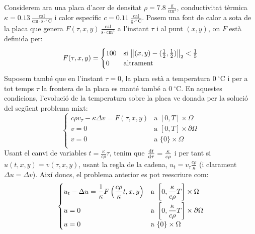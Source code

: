 \documentclass[10pt,a4paper]{article}
\theoremstyle{definition}
\theoremstyle{remark}
\begin{document}
Considerem ara una placa d'acer de densitat $\rho= 7.8\ \frac{\mathrm{g}}{\mathrm{cm}^3}$, conductivitat tèrmica $\kappa = 0.13\ \frac{\mathrm{cal}}{\mathrm{cm}\cdot\mathrm{s}\cdot^\circ\mathrm{C}}$ i calor específic $c=0.11\ \frac{\mathrm{cal}}{\mathrm{g}\cdot^\circ\mathrm{C}}$. Posem una font de calor a sota de la placa que genera $F(\tau, x,y) \ \frac{\mathrm{cal}}{\mathrm{s}\cdot\mathrm{cm}^3}$ a l'instant $\tau$ i al punt $(x,y)$, on $F$ està definida per:
$$
  F(\tau, x,y) = \begin{cases}
    100 & \text{si } \norm{(x,y)-(\frac{1}{2},\frac{1}{2})}_2 <\frac{1}{5} \\
    0   & \text{altrament}
  \end{cases}
$$
Suposem també que en l'instant $\tau=0$, la placa està a temperatura $0\ ^\circ\mathrm{C}$ i per a tot temps $\tau$ la frontera de la placa es manté també a $0\ ^\circ\mathrm{C}$. En aquestes condicions, l'evolució de la temperatura sobre la placa ve donada per la solució del següent problema mixt:
$$
  \begin{cases}
    c\rho v_{\tau} -\kappa \Delta v = F(\tau,x,y) & \text{a } [0,T] \times \Omega         \\
    v=0                                           & \text{a } [0,T] \times \partial\Omega \\
    v=0                                           & \text{a } \{0\} \times \Omega         \\
  \end{cases}
$$
Usant el canvi de variables $t=\frac{\kappa}{c\rho}\tau$, tenim que $\dv{t}{\tau}= \frac{\kappa}{c\rho}$ i per tant si $u(t,x,y)=v(\tau,x,y)$, usant la regla de la cadena, $u_t = v_\tau \frac{c\rho}{\kappa}$ (i clarament $\Delta u=\Delta v$). Així doncs, el problema anterior es pot reescriure com:
$$
  \begin{cases}
    \displaystyle u_t -\Delta u = \frac{1}{\kappa} F\left(\frac{c\rho}{\kappa}t,x,y\right) & \displaystyle\text{a } \left[0,\frac{\kappa}{c\rho}T\right] \times \Omega  \vspace{0.1cm} \\
    u=0                                                                                    & \displaystyle\text{a } \left[0,\frac{\kappa}{c\rho}T\right] \times \partial\Omega         \\
    u=0                                                                                    & \text{a } \{0\} \times \Omega                                                             \\
  \end{cases}
$$
\end{document}
